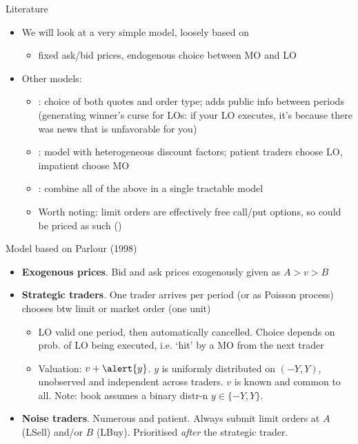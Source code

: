 \documentclass[english,10pt
,aspectratio=169
]{beamer}
\begin{document}
\begin{frame}{Literature}
	\begin{itemize}
		\item We will look at a very simple model, loosely based on \cite{parlour_price_1998}
		\begin{itemize}
			\item fixed ask/bid prices, endogenous choice between MO and LO
		\end{itemize}
		\item Other models:
		\begin{itemize}
			\item \cite{foucault_order_1999}: choice of both quotes and order type; adds public info between periods (generating winner's curse for LOs: if your LO executes, it's because there was news that is unfavorable for you)
			\item \citet*{foucault_limit_2005}: model with heterogeneous discount factors; patient traders choose LO, impatient choose MO
			\item \cite{bhattacharya_limit_2020}: combine all of the above in a single tractable model
			\item Worth noting: limit orders are effectively free call/put options, so could be priced as such (\cite{copeland_information_1983})
		\end{itemize}
	\end{itemize}
\end{frame}


\begin{frame}{Model based on Parlour (1998)}
	\begin{itemize}
		\item \textbf{Exogenous prices}. Bid and ask prices \alert{exogenously} given as $A>v>B$
		\item \textbf{Strategic traders}. One trader arrives per period (or as Poisson process) chooses btw limit or market order (one unit)
		\begin{itemize}
			\item LO valid one period, then automatically cancelled. Choice depends on prob. of LO being executed, i.e. `hit' by a MO from the next trader
			\item Valuation: $v+\alert{y}$. $y$ is uniformly distributed on $(-Y,Y)$, unobserved and independent across traders. $v$ is known and common to all.
			Note: book assumes a binary distr-n $y \in \{-Y,Y\}$.
		\end{itemize}
		\item \textbf{Noise traders}. Numerous and patient. Always submit limit orders at $A$ (LSell) and/or $B$ (LBuy). Prioritised \emph{after} the strategic trader.
	\end{itemize}
\end{frame}
\end{document}
